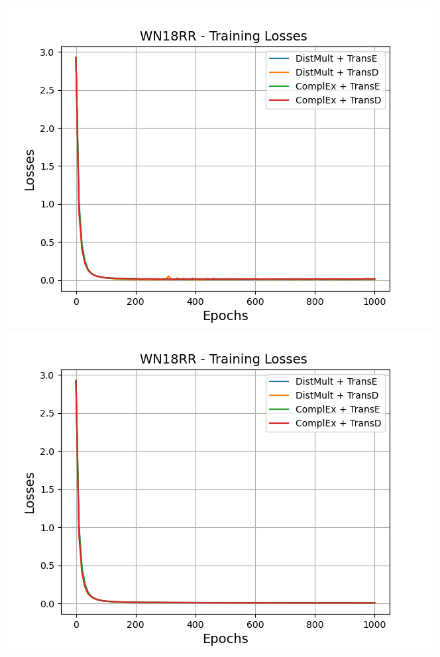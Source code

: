\begin{figure}
    \centering
    \begin{minipage}{.5\textwidth}
      \centering
      \includegraphics[width=0.9\linewidth]{figures/results/gan_train/not_pretrained/uncertainty/max/entropy/wn18rr/1k_epochs/uncertainty_wn18rr_losses.png}
    \end{minipage}%
    \begin{minipage}{.5\textwidth}
      \centering
      \includegraphics[width=0.9\linewidth]{figures/results/gan_train/not_pretrained/uncertainty/max_distribution/entropy/wn18rr/1k_epochs/uncertainty_wn18rr_losses.png}
    \end{minipage}
    \begin{minipage}{.5\textwidth}
      \centering

\end{minipage}
\end{figure}
